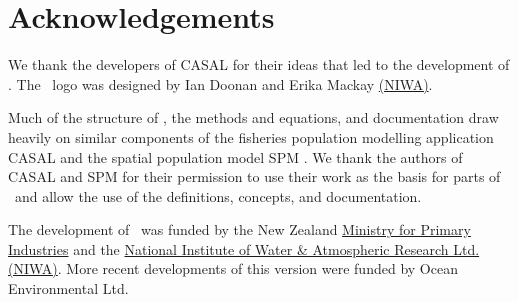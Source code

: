 \section{Acknowledgements\label{sec:acknowledgements}}

We thank the developers of CASAL \citep{1388} for their ideas that led to the development of \CNAME. The \CNAME\ logo was designed by Ian Doonan and Erika Mackay \href{http://www.niwa.co.nz}{(NIWA)}.

Much of the structure of \CNAME, the methods and equations, and documentation draw heavily on similar components of the fisheries population modelling application CASAL \citep{1388} and  the spatial population model SPM \citep{SPM}. We thank the authors of CASAL and SPM for their permission to use their work as the basis for parts of \CNAME\ and allow the use of the definitions, concepts, and documentation.

The development of \CNAME\ was funded by the New Zealand \href{http://www.mpi.govt.nz}{Ministry for Primary Industries} and the \href{http://www.niwa.co.nz}{National Institute of Water \& Atmospheric Research Ltd. (NIWA)}. More recent developments of this version were funded by Ocean Environmental Ltd.
